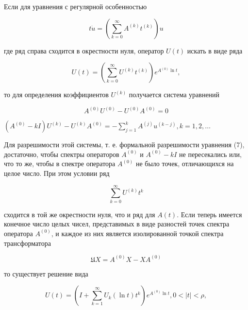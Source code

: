 \documentclass[10pt]{article}
\begin{document}
Если для уравнения с регулярной особенностью



\[

t \dot{u}=\left(\sum_{k=0}^{\infty} A^{(k)} t^{(k)}\right) u

\]



где ряд справа сходится в окрестности нуля, оператор $U(t)$ искать в виде ряда



\[

U(t)=\left(\sum_{k=0}^{\infty} U^{(k)} t^{(k)}\right) e^{A^{(0)} \ln t},

\]



то для определения коэффициентов $U^{(k)}$ получается система уравнений



\[

A^{(0)} U^{(0)}-U^{(0)} A^{(0)}=0

\]



$\left(A^{(0)}-k I\right) U^{(k)}-U^{(k)} A^{(0)}=-\sum_{j=1}^{k} A^{(j)} u^{(k-j)}, k=1,2, \ldots$



Для разрешимости этой системы, т. е. формальной разрешимости уравнения (7), достаточно, чтобы спектры операторов $A^{(0)}$ и $A^{(0)}-k I$ не пересекались или, что то же, чтобы в спектре оператора $A^{(0)}$ не было точек, отличающихся на целое число. При этом условии ряд



\[

\sum_{k=0}^{\infty} U^{(k)} t^{k}

\]



сходится в той же окрестности нуля, что и ряд для $A(t)$. Если теперь имеется конечное число целых чисел, представимых в виде разностей точек спектра оператора $A^{(0)}$, и каждое из них является изолированной точкой спектра трансформатора



\[

\mathfrak{U} X=A^{(0)} X-X A^{(0)}

\]



то существует решение вида



\[

U(t)=\left(I+\sum_{k=1}^{\infty} U_{k}(\ln t) t^{k}\right) e^{A^{(0)} \ln t}, 0<|t|<\rho,

\]
\end{document}
